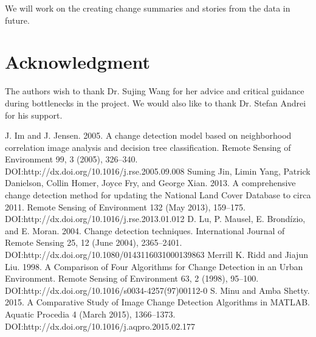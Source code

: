 \documentclass[conference]{IEEEtran}
\begin{document}
We will work on the creating change summaries and stories from the data in future.

\section*{Acknowledgment}


The authors wish to thank Dr. Sujing Wang for her advice and critical guidance during bottlenecks in the project. We would also like to thank Dr. Stefan Andrei for his support.


\newpage
\begin{thebibliography}{12}

  
\bibitem {} J. Im and J. Jensen. 2005. A change detection model based on neighborhood correlation image analysis and decision tree classification. Remote Sensing of Environment 99, 3 (2005), 326–340. DOI:http://dx.doi.org/10.1016/j.rse.2005.09.008 
\bibitem {} Suming Jin, Limin Yang, Patrick Danielson, Collin Homer, Joyce Fry, and George Xian. 2013. A comprehensive change detection method for updating the National Land Cover Database to circa 2011. Remote Sensing of Environment 132 (May 2013), 159–175. DOI:http://dx.doi.org/10.1016/j.rse.2013.01.012 
\bibitem {} D. Lu, P. Mausel, E. Brondízio, and E. Moran. 2004. Change detection techniques. International Journal of Remote Sensing 25, 12 (June 2004), 2365–2401. DOI:http://dx.doi.org/10.1080/0143116031000139863 
\bibitem {} Merrill K. Ridd and Jiajun Liu. 1998. A Comparison of Four Algorithms for Change Detection in an Urban Environment. Remote Sensing of Environment 63, 2 (1998), 95–100. DOI:http://dx.doi.org/10.1016/s0034-4257(97)00112-0 
\bibitem {} S. Minu and Amba Shetty. 2015. A Comparative Study of Image Change Detection Algorithms in MATLAB. Aquatic Procedia 4 (March 2015), 1366–1373. DOI:http://dx.doi.org/10.1016/j.aqpro.2015.02.177 



\end{thebibliography}
\end{document}
